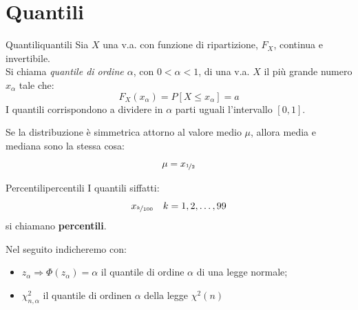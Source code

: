 \documentclass[12pt]{report}
\newcounter{definition}
\newcommand{\nmu}{}
\begin{document}
	\section{Quantili}
	\begin{definition}{\nmu Quantili}{quantili}
		Sia $X$ una v.a. con funzione di ripartizione, $F_X$, continua e invertibile. \\
		Si chiama \textit{quantile di ordine $\alpha$}, con $0 < \alpha < 1$, di una v.a. $X$ il più grande numero $x_\alpha$ tale che:
		\[
		F_X(x_\alpha) = P[X \leq x_\alpha] = a
		\]
		I quantili corrispondono a dividere in $\alpha$ parti uguali l'intervallo $[0, 1]$.
	\end{definition}
	\begin{note}{}{}
		Se la distribuzione è simmetrica attorno al valore medio $\mu$, allora media e mediana sono la stessa cosa:
		\[
		\mu = x_{\nicefrac{1}{2}}
		\]
	\end{note}
	\begin{note}{\nmu Percentili}{percentili}
		I quantili siffatti:
		\[
		x_{\nicefrac{k}{100}} \quad k = 1, 2, \dots, 99
		\]
		si chiamano \textbf{percentili}.
	\end{note}
	Nel seguito indicheremo con:
	\begin{itemize}
		\item $z_\alpha \Rightarrow \Phi(z_\alpha) = \alpha$ il quantile di ordine $\alpha$ di una legge normale;
		\item $\chi^2_{n, \alpha}$ il quantile di ordinen $\alpha$ della legge $\chi^2(n)$
	\end{itemize}
\end{document}
